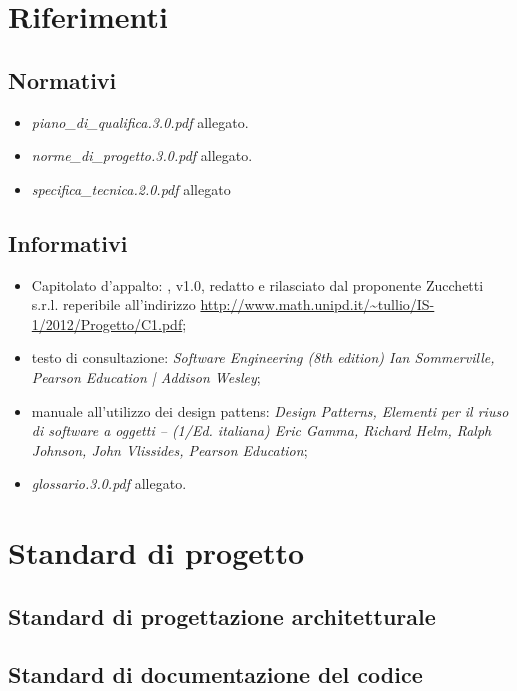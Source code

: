 
\clearpage

\section{Riferimenti}
\subsection{Normativi}
\begin{itemize}
\item[] \textit{piano\_di\_qualifica.3.0.pdf} allegato.
\item[] \textit{norme\_di\_progetto.3.0.pdf} allegato.
\item[] \textit{specifica\_tecnica.2.0.pdf} allegato
\end{itemize}

\subsection{Informativi}
\begin{itemize}
\item[] Capitolato d'appalto: \caName{}, v1.0, redatto e rilasciato dal proponente Zucchetti s.r.l. reperibile all'indirizzo \url{http://www.math.unipd.it/~tullio/IS-1/2012/Progetto/C1.pdf};
\item[] testo di consultazione: \textit{Software Engineering (8th edition) Ian Sommerville, Pearson Education | Addison Wesley};
\item[] manuale all'utilizzo dei design pattens: \textit{Design Patterns, Elementi per il riuso di software a oggetti -- (1/Ed. italiana) Eric Gamma, Richard Helm, Ralph Johnson, John Vlissides, Pearson Education};
\item[] \textit{glossario.3.0.pdf} allegato.
\end{itemize}
\clearpage

\section{Standard di progetto}

\subsection{Standard di progettazione architetturale}

\subsection{Standard di documentazione del codice}

